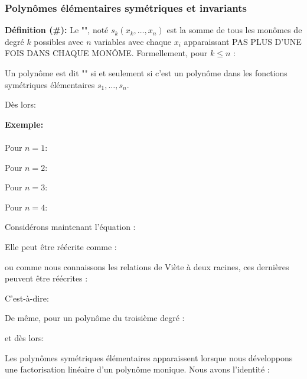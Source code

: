  	\subsubsection{Polynômes élémentaires symétriques et invariants}
 	\textbf{Définition (\#\mydef):} Le "", noté $s_k(x_k,\ldots , x_n)$ est la somme de tous les monômes de degré $k$ possibles avec $n$ variables avec chaque $x_i$ apparaissant PAS PLUS D'UNE FOIS DANS CHAQUE MONÔME. Formellement, pour $k\leq n$ :
	
	Un polynôme est dit "" si et seulement si c'est un polynôme dans les fonctions symétriques élémentaires $s_1,\ldots, s_n$.

	Dès lors:
	
	\begin{tcolorbox}[colframe=black,colback=white,sharp corners]
	\textbf{{\Large {}}Exemple:}\\\\
	Pour $n = 1$:
	
	Pour $n = 2$:
	
	Pour $n = 3$:
	
	Pour $n = 4$:
	
	Considérons maintenant l'équation :
	
	Elle peut être réécrite comme :
	
	ou comme nous connaissons les relations de Viète à deux racines, ces dernières peuvent être réécrites :
	
	\end{tcolorbox}
	
	\pagebreak
	\begin{tcolorbox}[colframe=black,colback=white,sharp corners]
	C'est-à-dire:
	
	De même, pour un polynôme du troisième degré :
	
	et dès lors:
	
	\end{tcolorbox}
	Les polynômes symétriques élémentaires apparaissent lorsque nous développons une factorisation linéaire d'un polynôme monique. Nous avons l'identité :
	
